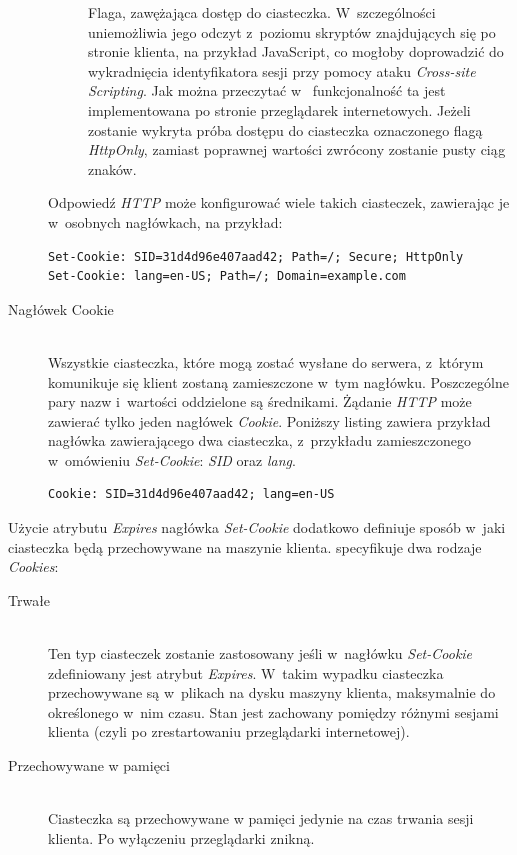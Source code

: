 \documentclass[11pt]{aghdpl}
\begin{document}
\begin{description}
\begin{description}
Flaga, zawężająca dostęp do ciasteczka. W~szczególności uniemożliwia jego odczyt z~poziomu skryptów znajdujących się po stronie klienta, na przykład JavaScript, co mogłoby doprowadzić do wykradnięcia identyfikatora sesji przy pomocy ataku \emph{Cross-site Scripting}. Jak można przeczytać w~\cite{HtOn} funkcjonalność ta jest implementowana po stronie przeglądarek internetowych. Jeżeli zostanie wykryta próba dostępu do ciasteczka oznaczonego flagą \emph{HttpOnly}, zamiast poprawnej wartości zwrócony zostanie pusty ciąg znaków. 
\end{description}
Odpowiedź \emph{HTTP} może konfigurować wiele takich ciasteczek, zawierając je w~osobnych nagłówkach, na przykład:
\begin{lstlisting}
Set-Cookie: SID=31d4d96e407aad42; Path=/; Secure; HttpOnly
Set-Cookie: lang=en-US; Path=/; Domain=example.com
\end{lstlisting}
\item[Nagłówek Cookie] \hfill \\
Wszystkie ciasteczka, które mogą zostać wysłane do serwera, z~którym komunikuje się klient zostaną zamieszczone w~tym nagłówku. Poszczególne pary nazw i~wartości oddzielone są średnikami. Żądanie \emph{HTTP} może zawierać tylko jeden nagłówek \emph{Cookie}. Poniższy listing zawiera przykład nagłówka zawierającego dwa ciasteczka, z~przykładu zamieszczonego w~omówieniu \emph{Set-Cookie}: \emph{SID} oraz \emph{lang}.
\begin{lstlisting}
Cookie: SID=31d4d96e407aad42; lang=en-US
\end{lstlisting}
\end{description}

Użycie atrybutu \emph{Expires} nagłówka \emph{Set-Cookie} dodatkowo definiuje sposób w~jaki ciasteczka będą przechowywane na maszynie klienta. \cite{MsC} specyfikuje dwa rodzaje \emph{Cookies}:

\begin{description}
\item[Trwałe] \hfill \\
Ten typ ciasteczek zostanie zastosowany jeśli w~nagłówku \emph{Set-Cookie} zdefiniowany jest atrybut \emph{Expires}. W~takim wypadku ciasteczka przechowywane są w~plikach na dysku maszyny klienta, maksymalnie do określonego w~nim czasu. Stan jest zachowany pomiędzy różnymi sesjami klienta (czyli po zrestartowaniu przeglądarki internetowej).
\item[Przechowywane w pamięci] \hfill \\
Ciasteczka są przechowywane w pamięci jedynie na czas trwania sesji klienta. Po wyłączeniu przeglądarki znikną.
\end{description}
\end{document}

